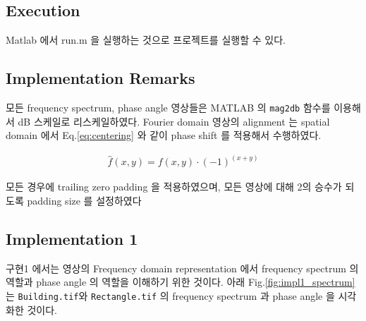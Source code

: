 \documentclass[a4paper, 12p]{paper}
\def\code#1{\texttt{#1}}
\begin{document}
\subsection{Execution}
Matlab 에서 run.m 을 실행하는 것으로 프로젝트를 실행할 수 있다. 

\subsection{Implementation Remarks}
모든 frequency spectrum, phase angle 영상들은 MATLAB 의 \code{mag2db} 함수를 이용해서 dB 스케일로 리스케일하였다. Fourier domain 영상의 alignment 는 spatial domain 에서 Eq.\ref{eq:centering} 와 같이 phase shift 를 적용해서 수행하였다.

\begin{align}
  \hat{f}(x, y) = f(x, y) \cdot {(-1)}^{(x + y)}\label{eq:centering}
\end{align}

모든 경우에 trailing zero padding 을 적용하였으며, 모든 영상에 대해 2의 승수가 되도록 padding size 를 설정하였다

\subsection{Implementation 1}
구현1 에서는 영상의 Frequency domain representation 에서 frequency spectrum 의 역할과 phase angle 의 역할을 이해하기 위한 것이다. 아래 Fig.\ref{fig:impl1_spectrum} 는 \code{Building.tif}와 \code{Rectangle.tif} 의 frequency spectrum 과 phase angle 을 시각화한 것이다. 
\end{document}
